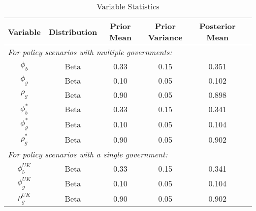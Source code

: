 \begin{table}[H]
    \centering
    \label{tab:priors_and_posteriors}
    \begin{tabular}{cccccc}
        \textbf{Variable} & \textbf{Distribution} & \textbf{Prior Mean} & \textbf{Prior Variance} & \textbf{Posterior Mean} \\
        \hline
        \multicolumn{5}{l}{\textit{For policy scenarios with multiple governments:}} \\
        $\phi_b$ & Beta & 0.33 & 0.15 & 0.351\\
        $\phi_g$ & Beta & 0.10 & 0.05 & 0.102\\
        $\rho_g$ & Beta & 0.90 & 0.05 & 0.898\\
        $\phi_b^*$ & Beta & 0.33 & 0.15 & 0.341\\
        $\phi_g^*$ & Beta & 0.10 & 0.05 & 0.104\\
        $\rho_g^*$ & Beta & 0.90 & 0.05 & 0.902\\
        \multicolumn{5}{l}{\textit{For policy scenarios with a single government:}} \\
        $\phi_b^{UK}$ & Beta & 0.33 & 0.15 & 0.341\\
        $\phi_g^{UK}$ & Beta & 0.10 & 0.05 & 0.104\\
        $\rho_g^{UK}$ & Beta & 0.90 & 0.05 & 0.902\\
    \end{tabular}
    \caption{Variable Statistics}
\end{table}